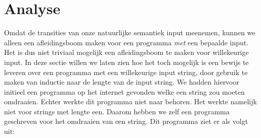 \section{Analyse}
\label{sec:analyse}

Omdat de transities van onze natuurlijke semantiek input meenemen, kunnen we
alleen een afleidingsboom maken voor een programma \emph{met} een bepaalde
input. Het is dus niet triviaal mogelijk een afleidingsboom te maken voor willekeurige
input. In deze sectie willen we laten zien hoe het toch mogelijk is een bewijs
te leveren over een programma met een willekeurige input string, door gebruik te maken
van inductie naar de lengte van de input string. We hadden hiervoor initieel een programma op het internet \cite{esolang:prog} gevonden welke een string zou moeten omdraaien. Echter werkte dit programma niet naar behoren. Het werkte namelijk niet voor strings met lengte een. Daarom hebben we zelf een programma geschreven voor het omdraaien van een string. Dit programma ziet er als volgt uit: 
